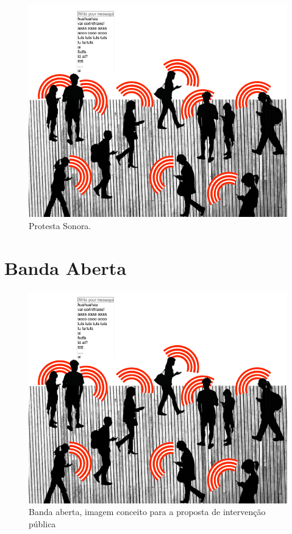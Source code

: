 \begin{figure}[htb]
    \caption{\label{protesta}Protesta Sonora. }
    \begin{center}
    \includegraphics[width=1\linewidth]{pictures/banda_aberta_mob_crowd.png}
    \end{center}
\end{figure}



\section{Banda Aberta}
\begin{figure}[htb]
    \caption{\label{bandaabertamob}Banda aberta, imagem conceito para a proposta de intervenção pública}
    \begin{center}
    \includegraphics[width=1\linewidth]{pictures/banda_aberta_mob_crowd.png}
    \end{center}
\end{figure}



